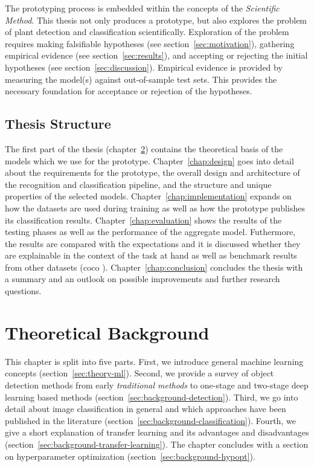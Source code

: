 \documentclass[draft,final]{vutinfth} %
\begin{document}
The prototyping process is embedded within the concepts of the
\emph{Scientific Method}. This thesis not only produces a prototype,
but also explores the problem of plant detection and classification
scientifically. Exploration of the problem requires making falsifiable
hypotheses (see section~\ref{sec:motivation}), gathering empirical
evidence (see section~\ref{sec:results}), and accepting or rejecting
the initial hypotheses (see section~\ref{sec:discussion}). Empirical
evidence is provided by measuring the model(s) against out-of-sample
test sets. This provides the necessary foundation for acceptance or
rejection of the hypotheses.

\section{Thesis Structure}
\label{sec:structure}

The first part of the thesis (chapter~\ref{chap:background}) contains
the theoretical basis of the models which we use for the
prototype. Chapter~\ref{chap:design} goes into detail about the
requirements for the prototype, the overall design and architecture of
the recognition and classification pipeline, and the structure and
unique properties of the selected
models. Chapter~\ref{chap:implementation} expands on how the datasets
are used during training as well as how the prototype publishes its
classification results. Chapter~\ref{chap:evaluation} shows the
results of the testing phases as well as the performance of the
aggregate model. Futhermore, the results are compared with the
expectations and it is discussed whether they are explainable in the
context of the task at hand as well as benchmark results from other
datasets (\gls{coco} \cite{lin2015}). Chapter~\ref{chap:conclusion}
concludes the thesis with a summary and an outlook on possible
improvements and further research questions.

\chapter{Theoretical Background}
\label{chap:background}

This chapter is split into five parts. First, we introduce general
machine learning concepts (section~\ref{sec:theory-ml}). Second, we
provide a survey of object detection methods from early
\emph{traditional methods} to one-stage and two-stage deep learning
based methods (section~\ref{sec:background-detection}). Third, we go
into detail about image classification in general and which approaches
have been published in the literature
(section~\ref{sec:background-classification}). Fourth, we give a short
explanation of transfer learning and its advantages and disadvantages
(section~\ref{sec:background-transfer-learning}). The chapter
concludes with a section on hyperparameter optimization
(section~\ref{sec:background-hypopt}).
\end{document}
